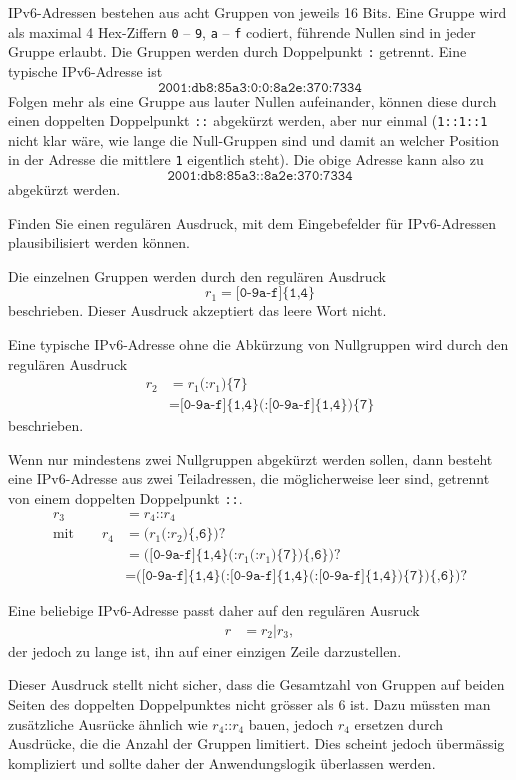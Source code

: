 IPv6-Adressen bestehen aus acht Gruppen von jeweils 16 Bits.
Eine Gruppe wird als maximal 4 Hex-Ziffern \texttt{0} -- \texttt{9},
\texttt{a} -- \texttt{f} codiert, führende Nullen sind in jeder Gruppe erlaubt.
Die Gruppen werden durch Doppelpunkt \texttt{:} getrennt.
Eine typische IPv6-Adresse ist
\[
\texttt{2001:db8:85a3:0:0:8a2e:370:7334}
\]
Folgen mehr als eine Gruppe aus lauter Nullen aufeinander, können diese 
durch einen doppelten Doppelpunkt \texttt{::} abgekürzt werden, aber
nur einmal (\texttt{1::1::1} nicht klar wäre, wie lange die Null-Gruppen
sind und damit an welcher Position in der Adresse die mittlere \texttt{1}
eigentlich steht).
Die obige Adresse kann also zu
\[
\texttt{2001:db8:85a3::8a2e:370:7334}
\]
abgekürzt werden.

Finden Sie einen regulären Ausdruck, mit dem Eingebefelder für IPv6-Adressen
plausibilisiert werden können.

\begin{loesung}
Die einzelnen Gruppen werden durch den regulären Ausdruck
\[
r_1 = \texttt{[0-9a-f]\{1,4\}}
\]
beschrieben.
Dieser Ausdruck akzeptiert das leere Wort nicht.

Eine typische IPv6-Adresse ohne die Abkürzung von Nullgruppen wird durch
den regulären Ausdruck 
\begin{align*}
r_2
&=
r_1\texttt{(:}r_1\texttt{)\{7\}}
\\
&=
\texttt{[0-9a-f]\{1,4\}}
\texttt{(:}
\texttt{[0-9a-f]\{1,4\}}
\texttt{)\{7\}}
\end{align*}
beschrieben.

Wenn nur mindestens zwei Nullgruppen abgekürzt werden sollen, dann
besteht eine IPv6-Adresse aus zwei Teiladressen, die möglicherweise
leer sind, getrennt von einem doppelten Doppelpunkt \texttt{::}.
\begin{align*}
r_3 &= r_4\texttt{::}r_4
\\
\text{mit}\qquad
r_4
&=
\texttt{(}r_1 \texttt{(:}r_2\texttt{)\{,6\}}\texttt{)?}
\\
&=
\texttt{(}
\texttt{[0-9a-f]\{1,4\}}
\texttt{(:}
r_1\texttt{(:}r_1\texttt{)\{7\}}
\texttt{)\{,6\}}\texttt{)?}
\\
&=
\texttt{(}
\texttt{[0-9a-f]\{1,4\}}
\texttt{(:}
\texttt{[0-9a-f]\{1,4\}}
\texttt{(:}
\texttt{[0-9a-f]\{1,4\}}
\texttt{)\{7\}}
\texttt{)\{,6\}}\texttt{)?}
\end{align*}

Eine beliebige IPv6-Adresse passt daher auf den regulären Ausruck
\begin{align*}
r
&=
r_2\texttt{|} r_3,
\end{align*}
der jedoch zu lange ist, ihn auf einer einzigen Zeile darzustellen.

Dieser Ausdruck stellt nicht sicher, dass die Gesamtzahl von Gruppen
auf beiden Seiten des doppelten Doppelpunktes nicht grösser als $6$ ist.
Dazu müssten man zusätzliche Ausrücke ähnlich wie $r_4\texttt{::}r_4$
bauen, jedoch $r_4$ ersetzen durch Ausdrücke, die die Anzahl der Gruppen
limitiert.
Dies scheint jedoch übermässig kompliziert und sollte daher der
Anwendungslogik überlassen werden.
\end{loesung}





